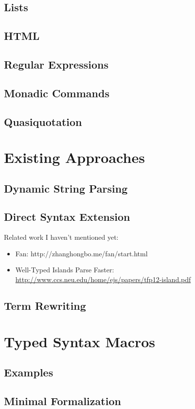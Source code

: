 \documentclass[12pt]{cmuthesis}
\begin{document}
\section{Lists}
\section{HTML}
\section{Regular Expressions}
\section{Monadic Commands}
\section{Quasiquotation}
\chapter{Existing Approaches}
\section{Dynamic String Parsing}
\section{Direct Syntax Extension}

Related work I haven't mentioned yet:
\begin{itemize}
\item Fan: http://zhanghongbo.me/fan/start.html
\item Well-Typed Islands Parse Faster: \\\url{http://www.ccs.neu.edu/home/ejs/papers/tfp12-island.pdf}
\end{itemize}
\section{Term Rewriting}
\chapter{Typed Syntax Macros}
\section{Examples}
\section{Minimal Formalization}
\end{document}
